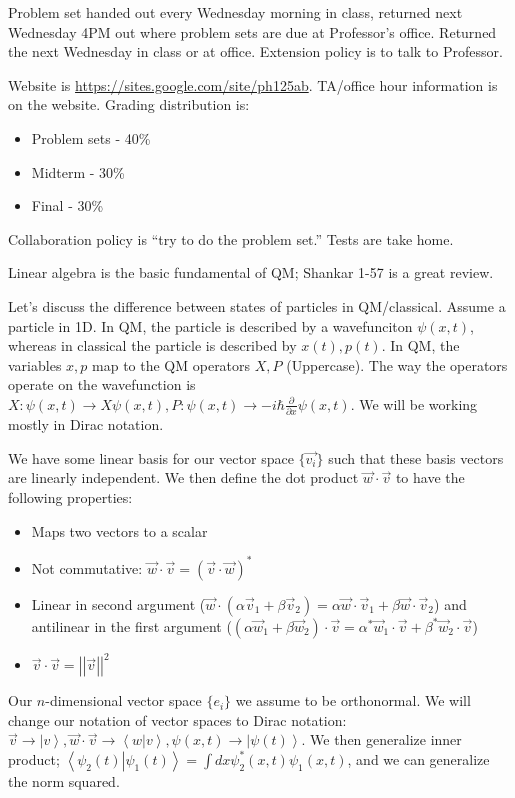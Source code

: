 \documentclass[10pt]{report}
\newcommand{\ket}[1]{\left|#1\right>}
\newcommand{\dotp}[2]{\left<#1\left.\right|#2\right>}
\newcommand{\norm}[1]{\left|\left|#1\right|\right|}
\begin{document}
Problem set handed out every Wednesday morning in class, returned next Wednesday 4PM out where problem sets are due at Professor's office. Returned the next Wednesday in class or at office. Extension policy is to talk to Professor.

Website is \url{https://sites.google.com/site/ph125ab}. TA/office hour information is on the website. Grading distribution is:

\begin{itemize}
	\item Problem sets - 40\%
	\item Midterm - 30\%
	\item Final - 30\%
\end{itemize}

Collaboration policy is ``try to do the problem set.'' Tests are take home.

Linear algebra is the basic fundamental of QM; Shankar 1-57 is a great review. 

Let's discuss the difference between states of particles in QM/classical. Assume a particle in 1D. In QM, the particle is described by a wavefunciton $\psi(x,t)$, whereas in classical the particle is described by $x(t),p(t)$. In QM, the variables $x,p$ map to the QM operators $X,P$ (Uppercase). The way the operators operate on the wavefunction is $X:\psi(x,t) \to X\psi(x,t), P:\psi(x,t) \to -i\hbar \frac{\partial}{\partial x} \psi(x,t)$. We will be working mostly in Dirac notation.

We have some linear basis for our vector space $\{\vec{v_i}\}$ such that these basis vectors are linearly independent. We then define the dot product $\vec{w}\cdot\vec{v}$ to have the following properties:

\begin{itemize}
	\item Maps two vectors to a scalar
	\item Not commutative: $\vec{w}\cdot\vec{v} =(\vec{v}\cdot\vec{w})^*$
	\item Linear in second argument ($\vec{w}\cdot\left( \alpha\vec{v}_1 + \beta\vec{v}_2 \right) = \alpha\vec{w}\cdot\vec{v}_1 + \beta \vec{w}\cdot\vec{v}_2$) and antilinear in the first argument ($\left(\alpha\vec{w}_1 + \beta\vec{w}_2\right) \cdot \vec{v} = \alpha^*\vec{w}_1\cdot\vec{v} + \beta^* \vec{w}_2\cdot\vec{v}$)
	\item $\vec{v}\cdot\vec{v} = \norm{\vec{v}}^2$
\end{itemize}

Our $n$-dimensional vector space $\{e_i\}$ we assume to be orthonormal. We will change our notation of vector spaces to Dirac notation: $\vec{v}\to\ket{v}, \vec{w}\cdot\vec{v} \to \dotp{w}{v}, \psi(x,t) \to \ket{\psi(t)}$. We then generalize inner product; $\dotp{\psi_2(t)}{\psi_1(t)}=\int dx \psi_2^*(x,t)\psi_1(x,t)$, and we can generalize the norm squared. 
\end{document}
